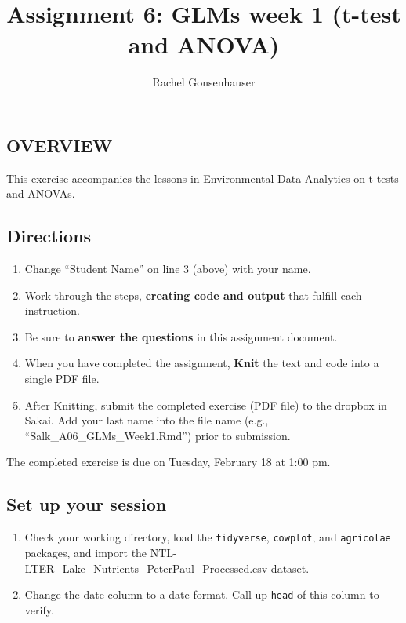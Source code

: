 \documentclass[]{article}
\title{Assignment 6: GLMs week 1 (t-test and ANOVA)}
\author{Rachel Gonsenhauser}
\date{}
\providecommand{\tightlist}{%
  \setlength{\itemsep}{0pt}\setlength{\parskip}{0pt}}
\begin{document}
\maketitle

\hypertarget{overview}{%
\subsection{OVERVIEW}\label{overview}}

This exercise accompanies the lessons in Environmental Data Analytics on
t-tests and ANOVAs.

\hypertarget{directions}{%
\subsection{Directions}\label{directions}}

\begin{enumerate}
\def\labelenumi{\arabic{enumi}.}
\tightlist
\item
  Change ``Student Name'' on line 3 (above) with your name.
\item
  Work through the steps, \textbf{creating code and output} that fulfill
  each instruction.
\item
  Be sure to \textbf{answer the questions} in this assignment document.
\item
  When you have completed the assignment, \textbf{Knit} the text and
  code into a single PDF file.
\item
  After Knitting, submit the completed exercise (PDF file) to the
  dropbox in Sakai. Add your last name into the file name (e.g.,
  ``Salk\_A06\_GLMs\_Week1.Rmd'') prior to submission.
\end{enumerate}

The completed exercise is due on Tuesday, February 18 at 1:00 pm.

\hypertarget{set-up-your-session}{%
\subsection{Set up your session}\label{set-up-your-session}}

\begin{enumerate}
\def\labelenumi{\arabic{enumi}.}
\item
  Check your working directory, load the \texttt{tidyverse},
  \texttt{cowplot}, and \texttt{agricolae} packages, and import the
  NTL-LTER\_Lake\_Nutrients\_PeterPaul\_Processed.csv dataset.
\item
  Change the date column to a date format. Call up \texttt{head} of this
  column to verify.
\end{enumerate}
\end{document}
